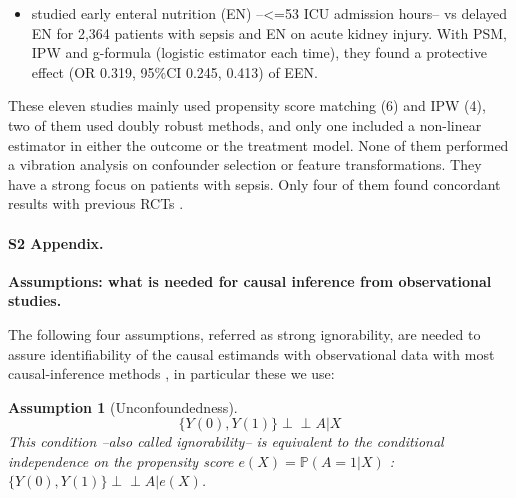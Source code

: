 \documentclass[10pt,letterpaper]{article}
\newcommand{\indep}{\perp \!\!\! \perp}
\newtheorem{assumption}{Assumption}
\providecommand{\DIFaddbegin}{} %
\providecommand{\DIFaddend}{} %
\newcommand{\DIFaddincludegraphics}[2][]{{\color{blue}\fbox{\DIFOincludegraphics[#1]{#2}}}} %
\DeclareRobustCommand{\DIFaddbegin}{\DIFOaddbegin \let\includegraphics\DIFaddincludegraphics} %
\DeclareRobustCommand{\DIFaddend}{\DIFOaddend \let\includegraphics\DIFOincludegraphics} %
\begin{document}
\begin{itemize}[leftmargin=2ex]
        in favor of albumin used for severe sepsis patients and a significant
        reduction for septic shock patients, both on 90-day mortality. These
        results are aligned with \cite{caironi2014albumin} that found no effect
        for severe sepsis patient but positive effect for septic shock patients.
  \item \cite{wang2023early} studied \textcolor{I}{early enteral nutrition (EN)
          --<=53 ICU admission hours--} vs \textcolor{C}{delayed EN} for
        \textcolor{P}{2,364 patients with sepsis and EN} on
        \textcolor{O}{acute kidney injury}. With PSM, IPW and g-formula
        (logistic estimator each time), they found a protective effect
        (OR 0.319, 95\%CI 0.245, 0.413) of EEN.
\end{itemize}

These eleven studies mainly used propensity score matching (6) and IPW (4), two of
them used doubly robust methods, and only one included a non-linear estimator in
either the outcome or the treatment model. None of them performed a vibration
analysis on confounder selection or feature transformations. They have a
strong focus on patients with sepsis. Only four of them found concordant results with
previous RCTs \cite{liu2021effects,shahn2020fluid,adibuzzaman2019323}.
\DIFaddbegin \clearpage
\DIFaddend


\paragraph*{S2 Appendix.}
\label{apd:causal_assumptions}
{\bf Assumptions: what is needed for causal inference from observational studies.}


The following four assumptions, referred as strong ignorability, are
needed to assure identifiability of the causal estimands with observational
data with most causal-inference methods \cite{rubin2005causal}, in
particular these we use:

\begin{assumption}[Unconfoundedness]\label{assumption:ignorability}
  \begin{equation}\label{eq:ignorability}
    \{Y(0), Y(1) \} \indep A | X
  \end{equation}
  This condition --also called ignorability-- is equivalent to the conditional
  independence on the propensity score $e(X)=\mathbb P(A=1|X)$ \cite{rosenbaum1983central}: $\{Y(0), Y(1) \}\indep  A | e(X)$.
\end{assumption}
\end{document}
